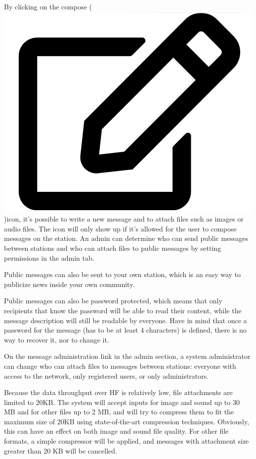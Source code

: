 \documentclass[11pt,a4paper]{article}
\begin{document}
By clicking on the compose (\includegraphics[height=0.8\baselineskip]{pictures/edit.png})icon, it's possible to write a new message and to attach files such as images or audio files. The icon will only show up if it's allowed for the user to compose messages on the station. An admin can determine who can send public messages between stations and who can attach files to public messages by setting permissions in the admin tab. 

Public messages can also be sent to your own station, which is an easy way to publicize news inside your own community.

Public messages can also be password protected, which means that only recipients that know the password will be able to read their content, while the message description will still be readable by everyone. Have in mind that once a password for the message (has to be at least 4 characters) is defined, there is no way to recover it, nor to change it.

On the message administration link in the admin section, a system administrator can change who can attach files to messages between stations: everyone with access to the network, only registered users, or only administrators. 

Because the data throughput over HF is relatively low, file attachments are limited to 20KB. The system will accept inputs for image and sound up to 30 MB and for other files up to 2 MB, and will try to compress them to fit the maximum size of 20KB using state-of-the-art compression techniques. Obviously, this can have an effect on both image and sound file quality. For other file formats, a simple compressor will be applied, and messages with attachment size greater than 20 KB will be cancelled.%
\end{document}
